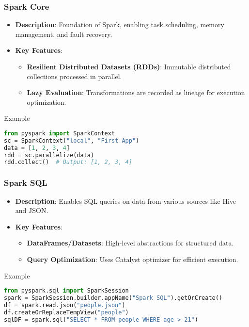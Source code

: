 \documentclass[aspectratio=169]{beamer}
\begin{document}
\begin{frame}[fragile]
    \frametitle{Spark Core}
    \begin{itemize}
        \item \textbf{Description}: Foundation of Spark, enabling task scheduling, memory management, and fault recovery.
        \item \textbf{Key Features}:
            \begin{itemize}
                \item \textbf{Resilient Distributed Datasets (RDDs)}: Immutable distributed collections processed in parallel.
                \item \textbf{Lazy Evaluation}: Transformations are recorded as lineage for execution optimization.
            \end{itemize}
    \end{itemize}
    \begin{block}{Example}
        \begin{lstlisting}[language=Python]
from pyspark import SparkContext
sc = SparkContext("local", "First App")
data = [1, 2, 3, 4]
rdd = sc.parallelize(data)
rdd.collect()  # Output: [1, 2, 3, 4]
        \end{lstlisting}
    \end{block}
\end{frame}

\begin{frame}[fragile]
    \frametitle{Spark SQL}
    \begin{itemize}
        \item \textbf{Description}: Enables SQL queries on data from various sources like Hive and JSON.
        \item \textbf{Key Features}:
            \begin{itemize}
                \item \textbf{DataFrames/Datasets}: High-level abstractions for structured data.
                \item \textbf{Query Optimization}: Uses Catalyst optimizer for efficient execution.
            \end{itemize}
    \end{itemize}
    \begin{block}{Example}
        \begin{lstlisting}[language=Python]
from pyspark.sql import SparkSession
spark = SparkSession.builder.appName("Spark SQL").getOrCreate()
df = spark.read.json("people.json")
df.createOrReplaceTempView("people")
sqlDF = spark.sql("SELECT * FROM people WHERE age > 21")
        \end{lstlisting}
    \end{block}
\end{frame}
\end{document}
